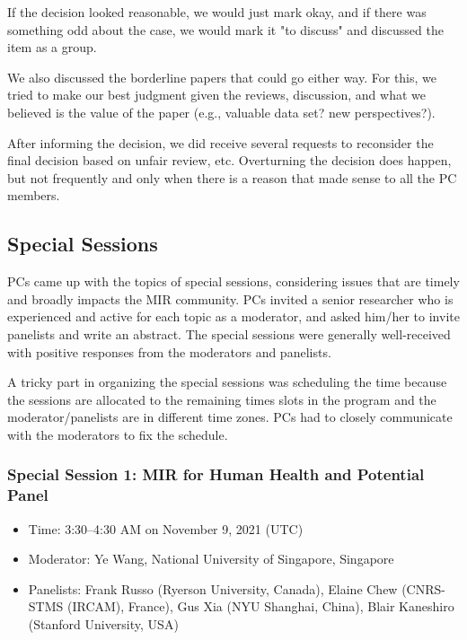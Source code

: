 \documentclass[%
10pt,								%
titlepage,						%
]
{scrartcl}
\begin{document}
            If the decision looked reasonable, we would just mark okay, and if there was something odd about the case, we would mark it "to discuss" and discussed the item as a group.

            We also discussed the borderline papers that could go either way. For this, we tried to make our best judgment given the reviews, discussion, and what we believed is the value of the paper (e.g., valuable data set? new perspectives?).
            
            After informing the decision, we did receive several requests to reconsider the final decision based on unfair review, etc. Overturning the decision does happen, but not frequently and only when there is a reason that made sense to all the PC members.

    \subsection{Special Sessions}
        PCs came up with the topics of special sessions, considering issues that are timely and broadly impacts the MIR community. PCs invited a senior researcher who is experienced and active for each topic as a moderator, and asked him/her to invite panelists and write an abstract. The special sessions were generally well-received with positive responses from the moderators and panelists. 

        A tricky part in organizing the special sessions was scheduling the time because the sessions are allocated to the remaining times slots in the program and the moderator/panelists are in different time zones. PCs had to closely communicate with the moderators to fix the schedule.


        \subsubsection{Special Session 1: MIR for Human Health and Potential Panel}
        \begin{itemize}
            \item Time: 3:30--4:30 AM on November 9, 2021 (UTC)
            \item   Moderator: Ye Wang, National University of Singapore, Singapore
            \item   Panelists: Frank Russo (Ryerson University, Canada), Elaine Chew (CNRS-STMS (IRCAM), France), Gus Xia (NYU Shanghai, China), Blair Kaneshiro (Stanford University, USA)

        \end{itemize}
        
\end{document}
